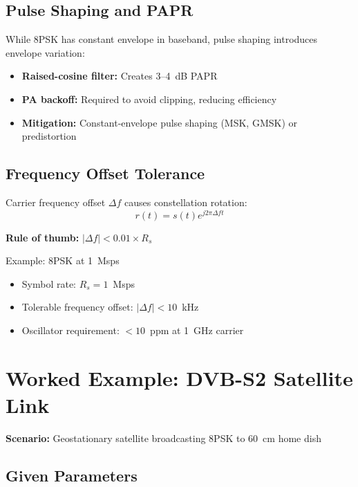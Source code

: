 \subsection{Pulse Shaping and PAPR}

While 8PSK has constant envelope in baseband, pulse shaping introduces envelope variation:
\begin{itemize}
\item \textbf{Raised-cosine filter:} Creates 3--4~dB PAPR
\item \textbf{PA backoff:} Required to avoid clipping, reducing efficiency
\item \textbf{Mitigation:} Constant-envelope pulse shaping (MSK, GMSK) or predistortion
\end{itemize}

\subsection{Frequency Offset Tolerance}

Carrier frequency offset $\Delta f$ causes constellation rotation:
\begin{equation}
r(t) = s(t) e^{j2\pi \Delta f t}
\end{equation}

\textbf{Rule of thumb:} $|\Delta f| < 0.01 \times R_s$

\begin{calloutbox}{Example: 8PSK at 1~Msps}
\begin{itemize}
\item Symbol rate: $R_s = 1$~Msps
\item Tolerable frequency offset: $|\Delta f| < 10$~kHz
\item Oscillator requirement: $< 10$~ppm at 1~GHz carrier
\end{itemize}
\end{calloutbox}

\section{Worked Example: DVB-S2 Satellite Link}

\textbf{Scenario:} Geostationary satellite broadcasting 8PSK to 60~cm home dish

\subsection*{Given Parameters}

